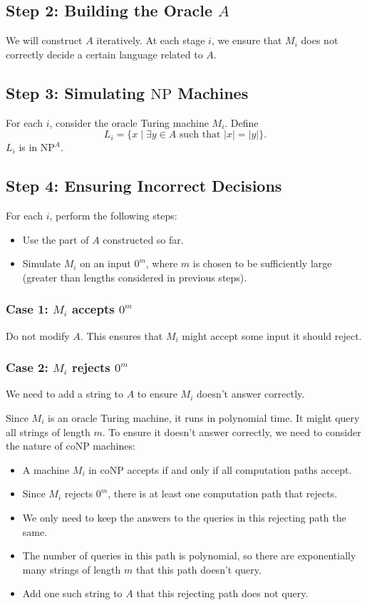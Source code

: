 \documentclass{article}
\begin{document}
\subsection*{Step 2: Building the Oracle $A$}

We will construct $A$ iteratively. At each stage $i$, we ensure that $M_i$ does not correctly decide a certain language related to $A$. 

\subsection*{Step 3: Simulating $\text{NP}$ Machines}

For each $i$, consider the oracle Turing machine $M_i$. Define
\[ L_i = \{ x \mid \exists y \in A \text{ such that } |x| = |y| \}. \]
$L_i$ is in $\text{NP}^A$.

\subsection*{Step 4: Ensuring Incorrect Decisions}

For each $i$, perform the following steps:
\begin{itemize}
    \item Use the part of $A$ constructed so far.
    \item Simulate $M_i$ on an input $0^m$, where $m$ is chosen to be sufficiently large (greater than lengths considered in previous steps).
\end{itemize}

\subsubsection*{Case 1: $M_i$ accepts $0^m$}

Do not modify $A$. This ensures that $M_i$ might accept some input it should reject.

\subsubsection*{Case 2: $M_i$ rejects $0^m$}

We need to add a string to $A$ to ensure $M_i$ doesn't answer correctly.

Since $M_i$ is an oracle Turing machine, it runs in polynomial time. It might query all strings of length $m$. To ensure it doesn't answer correctly, we need to consider the nature of $\text{coNP}$ machines:
\begin{itemize}
    \item A machine $M_i$ in $\text{coNP}$ accepts if and only if all computation paths accept.
    \item Since $M_i$ rejects $0^m$, there is at least one computation path that rejects.
    \item We only need to keep the answers to the queries in this rejecting path the same.
    \item The number of queries in this path is polynomial, so there are exponentially many strings of length $m$ that this path doesn't query.
    \item Add one such string to $A$ that this rejecting path does not query.
\end{itemize}
\end{document}

